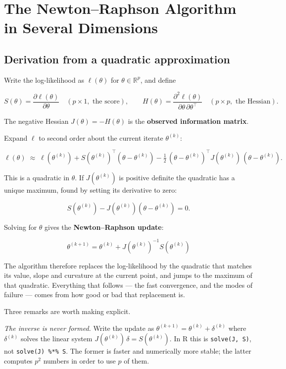 \documentclass[
  letterpaper,
  DIV=11,
  numbers=noendperiod]{scrreprt}
\begin{document}
\section{The Newton--Raphson Algorithm in Several
Dimensions}\label{the-newtonraphson-algorithm-in-several-dimensions}

\subsection{Derivation from a quadratic
approximation}\label{derivation-from-a-quadratic-approximation}

Write the log-likelihood as \(\ell(\theta)\) for
\(\theta \in \mathbb{R}^p\), and define

\[
S(\theta) = \frac{\partial \ell(\theta)}{\partial \theta}
\quad (p \times 1, \text{ the score}),
\qquad
H(\theta) = \frac{\partial^2 \ell(\theta)}{\partial \theta \, \partial \theta^{\top}}
\quad (p \times p, \text{ the Hessian}).
\]

The negative Hessian \(J(\theta) = -H(\theta)\) is the \textbf{observed
information matrix}.

Expand \(\ell\) to second order about the current iterate
\(\theta^{(k)}\):

\[
\ell(\theta) \;\approx\; \ell(\theta^{(k)})
 + S(\theta^{(k)})^{\top}(\theta - \theta^{(k)})
 - \tfrac{1}{2}\,(\theta - \theta^{(k)})^{\top} J(\theta^{(k)}) \,(\theta - \theta^{(k)}).
\]

This is a quadratic in \(\theta\). If \(J(\theta^{(k)})\) is positive
definite the quadratic has a unique maximum, found by setting its
derivative to zero:

\[
S(\theta^{(k)}) - J(\theta^{(k)})(\theta - \theta^{(k)}) = 0 .
\]

Solving for \(\theta\) gives the \textbf{Newton--Raphson update}:

\[
\boxed{\;\theta^{(k+1)} = \theta^{(k)} + J(\theta^{(k)})^{-1} S(\theta^{(k)}) \;}
\]

The algorithm therefore replaces the log-likelihood by the quadratic
that matches its value, slope and curvature at the current point, and
jumps to the maximum of that quadratic. Everything that follows --- the
fast convergence, and the modes of failure --- comes from how good or
bad that replacement is.

Three remarks are worth making explicit.

\emph{The inverse is never formed.} Write the update as
\(\theta^{(k+1)} = \theta^{(k)} + \delta^{(k)}\) where \(\delta^{(k)}\)
solves the linear system \(J(\theta^{(k)})\,\delta = S(\theta^{(k)})\).
In R this is \texttt{solve(J,\ S)}, not \texttt{solve(J)\ \%*\%\ S}. The
former is faster and numerically more stable; the latter computes
\(p^2\) numbers in order to use \(p\) of them.
\end{document}
